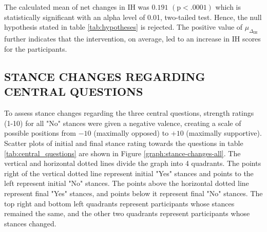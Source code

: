 \documentclass[journal]{IEEEtran}
\begin{document}
The calculated mean of net changes in IH was $0.191$ $(\text{p}<.0001)$ which is statistically significant with an alpha level of 0.01, two-tailed test. Hence, the null hypothesis stated in table \ref{tab:hypotheses} is rejected. The positive value of $\mu_{\Delta_\text{IH}}$ further indicates that the intervention, on average, led to an increase in IH scores for the participants.

\subsection{STANCE CHANGES REGARDING CENTRAL QUESTIONS}
 To assess stance changes regarding the three central questions, strength ratings (1-10) for all "No" stances were given a negative valence, creating a scale of possible positions from $-10$ (maximally opposed) to $+10$ (maximally supportive). Scatter plots of initial and final stance rating towards the questions in table \ref{tab:central_questions} are shown in Figure \ref{graph:stance-changes-all}. The vertical and horizontal dotted lines divide the graph into 4 quadrants. The points right of the vertical dotted line represent initial "Yes" stances and points to the left represent initial "No" stances. The points above the horizontal dotted line represent final "Yes" stances, and points below it represent final "No" stances. The top right and bottom left quadrants represent participants whose stances remained the same, and the other two quadrants represent participants whose stances changed. 
\end{document}
